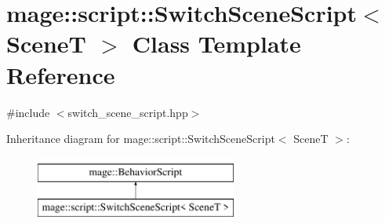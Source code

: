 \hypertarget{classmage_1_1script_1_1_switch_scene_script}{}\section{mage\+:\+:script\+:\+:Switch\+Scene\+Script$<$ SceneT $>$ Class Template Reference}
\label{classmage_1_1script_1_1_switch_scene_script}


{\ttfamily \#include $<$switch\+\_\+scene\+\_\+script.\+hpp$>$}

Inheritance diagram for mage\+:\+:script\+:\+:Switch\+Scene\+Script$<$ SceneT $>$\+:\begin{figure}[H]
\begin{center}
\leavevmode
\includegraphics[height=2.000000cm]{classmage_1_1script_1_1_switch_scene_script}
\end{center}
\end{figure}
